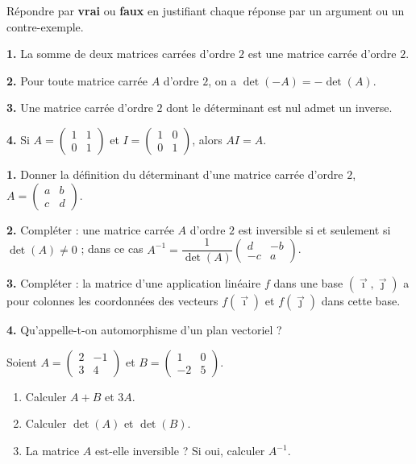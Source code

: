 \documentclass[11pt]{article}
\newcommand{\cle}[1]{{\popxbold\color{popdark}#1}}
\begin{document}
\begin{exercice}
Répondre par \textbf{vrai} ou \textbf{faux} en justifiant chaque réponse par un argument ou un contre-exemple.

\textbf{1.} La somme de deux matrices carrées d'ordre $2$ est une matrice carrée d'ordre $2$.

\textbf{2.} Pour toute matrice carrée $A$ d'ordre $2$, on a $\det(-A) = -\det(A)$.

\textbf{3.} Une matrice carrée d'ordre $2$ dont le déterminant est nul admet un inverse.

\textbf{4.} Si $A = \begin{pmatrix} 1 & 1 \\ 0 & 1 \end{pmatrix}$ et $I = \begin{pmatrix} 1 & 0 \\ 0 & 1 \end{pmatrix}$, alors $AI = A$.
\end{exercice}

\begin{exercice}
\textbf{1.} Donner la définition du déterminant d'une matrice carrée d'ordre $2$, $A = \begin{pmatrix} a & b \\ c & d \end{pmatrix}$.

\textbf{2.} Compléter : une matrice carrée $A$ d'ordre $2$ est inversible si et seulement si $\det(A) \neq 0$ ; dans ce cas $A^{-1} = \dfrac{1}{\det(A)}\begin{pmatrix} d & -b \\ -c & a \end{pmatrix}$.

\textbf{3.} Compléter : la matrice d'une application linéaire $f$ dans une base $(\vec{\imath}, \vec{\jmath})$ a pour colonnes les coordonnées des vecteurs $f(\vec{\imath})$ et $f(\vec{\jmath})$ dans cette base.

\textbf{4.} Qu'appelle-t-on \cle{automorphisme} d'un plan vectoriel ?
\end{exercice}

\begin{exercice}
Soient $A = \begin{pmatrix} 2 & -1 \\ 3 & 4 \end{pmatrix}$ et $B = \begin{pmatrix} 1 & 0 \\ -2 & 5 \end{pmatrix}$.
\begin{enumerate}
\item Calculer $A + B$ et $3A$.
\item Calculer $\det(A)$ et $\det(B)$.
\item La matrice $A$ est-elle inversible ? Si oui, calculer $A^{-1}$.
\end{enumerate}
\end{exercice}
\end{document}
